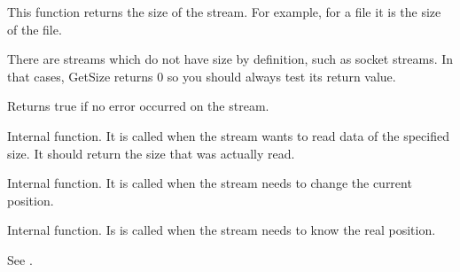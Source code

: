 \label{wxstreambasegetsize}



This function returns the size of the stream. For example, for a file it is the
size of the file.


There are streams which do not have size by definition, such as socket streams.
In that cases, GetSize returns $0$ so you should always test its return value.


\label{wxstreambaseisok}


Returns true if no error occurred on the stream.




\label{wxstreambaseonsysread}


Internal function. It is called when the stream wants to read data of the
specified size. It should return the size that was actually read.


\label{wxstreambaseonsysseek}


Internal function. It is called when the stream needs to change the
current position.


\label{wxstreambaseonsystell}


Internal function. Is is called when the stream needs to know the
real position.


\label{wxstreambaseonsyswrite}


See .


